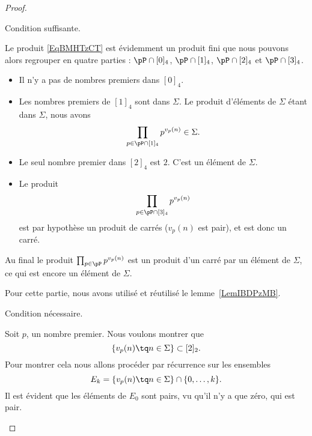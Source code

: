 \begin{proof}
    \begin{subproof}
    \item[Condition suffisante.]

        Le produit \eqref{EqBMHTzCT} est évidemment un produit fini que nous pouvons alors regrouper en quatre parties : \( \pP\cap[0]_4\), \( \pP\cap[1]_4\), \( \pP\cap[2]_4\) et \( \pP\cap[3]_4\).

        \begin{itemize}
            \item Il n'y a pas de nombres premiers dans \( [0]_4\).
            \item Les nombres premiers de \( [1]_4\) sont dans \( \Sigma\). Le produit d'éléments de \( \Sigma\) étant dans \( \Sigma\), nous avons
                \begin{equation}
                    \prod_{p\in\pP\cap[1]_4}p^{v_p(n)}\in \Sigma.
                \end{equation}
            \item
                Le seul nombre premier dans \( [2]_4\) est \( 2\). C'est un élément de \( \Sigma\).
            \item
                Le produit
                \begin{equation}
                    \prod_{p\in\pP\cap[3]_4}p^{v_p(n)}
                \end{equation}
                est par hypothèse un produit de carrés (\( v_p(n)\) est pair), et est donc un carré.
        \end{itemize}
        Au final le produit \( \prod_{p\in\pP}p^{v_p(n)}\) est un produit d'un carré par un élément de \( \Sigma\), ce qui est encore un élément de \( \Sigma\).

        Pour cette partie, nous avons utilisé et réutilisé le lemme~\ref{LemIBDPzMB}.

    \item[Condition nécessaire.]

        Soit \( p\), un nombre premier. Nous voulons montrer que
        \begin{equation}
            \{ v_p(n)\tq n\in \Sigma \}\subset [2]_2.
        \end{equation}
        Pour montrer cela nous allons procéder par récurrence sur les ensembles
        \begin{equation}
            E_k=\{ v_p(n)\tq n\in \Sigma \}\cap\{ 0,\ldots, k \}.
        \end{equation}
        Il est évident que les éléments de \( E_0\) sont pairs, vu qu'il n'y a que zéro, qui est pair.


\end{subproof}
\end{proof}
